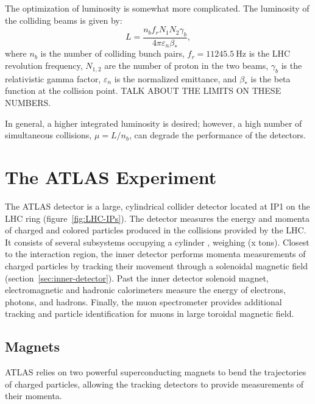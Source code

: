 The optimization of luminosity is somewhat more complicated.  The luminosity of the colliding beams is given by:
\begin{equation}\label{eqn:lumi}
	L = \frac{n_b f_r N_1 N_2 \gamma_b}{4\pi \varepsilon_n \beta_{*}},
\end{equation}
where $n_b$ is the number of colliding bunch pairs, $f_r=11245.5~\mbox{Hz}$ is the LHC revolution frequency, $N_{1,2}$ are the number of proton in the two beams, $\gamma_b$ is the relativistic gamma factor, $\varepsilon_n$ is the normalized emittance, and $\beta_{*}$ is the beta function at the collision point. TALK ABOUT THE LIMITS ON THESE NUMBERS.

In general, a higher integrated luminosity is desired; however, a high number of simultaneous collisions, $\mu=L/n_b$, can degrade the performance of the detectors. 





\section{The ATLAS Experiment}
The ATLAS detector is a large, cylindrical collider detector located at IP1 on the LHC ring (figure~\ref{fig:LHC-IPs}). The detector measures the energy and momenta of charged and colored particles produced in the collisions provided by the LHC. It consists of several subsystems occupying a cylinder , weighing (x tons). Closest to the interaction region, the inner detector performs momenta measurements of charged particles by tracking their movement through a solenoidal magnetic field (section~\ref{sec:inner-detector}). Past the inner detector solenoid magnet, electromagnetic and hadronic calorimeters measure the energy of electrons, photons, and hadrons. Finally, the muon spectrometer provides additional tracking and particle identification for muons in large toroidal magnetic field. 




\subsection{Magnets}
ATLAS relies on two powerful superconducting magnets to bend the trajectories of charged particles, allowing the tracking detectors to provide measurements of their momenta. 

